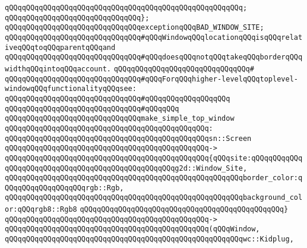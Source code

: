 \verb|qQQqqQQqqQQqqQQqqQQqqQQqqQQqqQQqqQQqqQQqqQQqqQQqqQQqqQQq;|\newline
\verb|qQQqqQQqqQQqqQQqqQQqqQQqqQQqqQQq};|\newline
\newline
\verb|qQQqqQQqqQQqqQQqqQQqqQQqqQQqqQQqexceptionqQQqBAD_WINDOW_SITE;|\newline
\newline
\verb|qQQqqQQqqQQqqQQqqQQqqQQqqQQqqQQq#qQQqWindowqQQqlocationqQQqisqQQqrelativeqQQqtoqQQqparentqQQqand|\newline
\verb|qQQqqQQqqQQqqQQqqQQqqQQqqQQqqQQq#qQQqdoesqQQqnotqQQqtakeqQQqborderqQQqwidthqQQqintoqQQqaccount.|\newline
\verb|qQQqqQQqqQQqqQQqqQQqqQQqqQQqqQQq#|\newline
\verb|qQQqqQQqqQQqqQQqqQQqqQQqqQQqqQQq#qQQqForqQQqhigher-levelqQQqtoplevel-windowqQQqfunctionalityqQQqsee:|\newline
\verb|qQQqqQQqqQQqqQQqqQQqqQQqqQQqqQQq#qQQqqQQqqQQqqQQqqQQq|\newline
\verb|qQQqqQQqqQQqqQQqqQQqqQQqqQQqqQQq#qQQqqQQq|\newline
\verb|qQQqqQQqqQQqqQQqqQQqqQQqqQQqqQQqmake_simple_top_window|\newline
\verb|qQQqqQQqqQQqqQQqqQQqqQQqqQQqqQQqqQQqqQQqqQQqqQQq:|\newline
\verb|qQQqqQQqqQQqqQQqqQQqqQQqqQQqqQQqqQQqqQQqqQQqqQQqsn::Screen|\newline
\verb|qQQqqQQqqQQqqQQqqQQqqQQqqQQqqQQqqQQqqQQqqQQqqQQq->|\newline
\verb|qQQqqQQqqQQqqQQqqQQqqQQqqQQqqQQqqQQqqQQqqQQqqQQq{qQQqsite:qQQqqQQqqQQqqQQqqQQqqQQqqQQqqQQqqQQqqQQqqQQqqQQqqQQqg2d::Window_Site,|\newline
\verb|qQQqqQQqqQQqqQQqqQQqqQQqqQQqqQQqqQQqqQQqqQQqqQQqqQQqqQQqborder_color:qQQqqQQqqQQqqQQqqQQqrgb::Rgb,|\newline
\verb|qQQqqQQqqQQqqQQqqQQqqQQqqQQqqQQqqQQqqQQqqQQqqQQqqQQqqQQqbackground_color:qQQqrgb8::Rgb8|\newline
\verb|qQQqqQQqqQQqqQQqqQQqqQQqqQQqqQQqqQQqqQQqqQQqqQQq}|\newline
\verb|qQQqqQQqqQQqqQQqqQQqqQQqqQQqqQQqqQQqqQQqqQQqqQQq->|\newline
\verb|qQQqqQQqqQQqqQQqqQQqqQQqqQQqqQQqqQQqqQQqqQQqqQQq(qQQqWindow,|\newline
\verb|qQQqqQQqqQQqqQQqqQQqqQQqqQQqqQQqqQQqqQQqqQQqqQQqqQQqqQQqwc::Kidplug,|\newline
